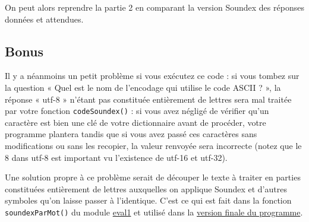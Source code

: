\documentclass[french]{scrartcl}
\begin{document}
On peut alors reprendre la partie 2 en comparant la version Soundex des
réponses données et attendues.

\hypertarget{bonus}{%
\subsection{Bonus}\label{bonus}}

Il y a néanmoins un petit problème si vous exécutez ce code : si vous
tombez sur la question « Quel est le nom de l'encodage qui utilise le
code ASCII ? », la réponse « utf-8 » n'étant pas constituée entièrement
de lettres sera mal traitée par votre fonction \texttt{codeSoundex()} :
si vous avez négligé de vérifier qu'un caractère est bien une clé de
votre dictionnaire avant de procéder, votre programme plantera tandis
que si vous avez passé ces caractères sans modifications ou sans les
recopier, la valeur renvoyée sera incorrecte (notez que le 8 dans utf-8
est important vu l'existence de utf-16 et utf-32).

Une solution propre à ce problème serait de découper le texte à traiter
en parties constituées entièrement de lettres auxquelles on applique
Soundex et d'autres symboles qu'on laisse passer à l'identique. C'est ce
qui est fait dans la fonction \texttt{soundexParMot()} du module
\href{eval1.py}{eval1} et utilisé dans la \href{partie3.py}{version
finale du programme}.
\end{document}
